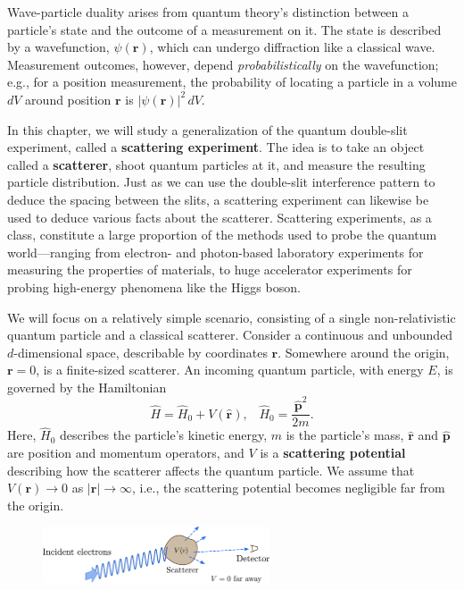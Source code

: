 \documentclass[pra,12pt]{revtex4}
\begin{document}
Wave-particle duality arises from quantum theory's distinction between
a particle's state and the outcome of a measurement on it.  The state
is described by a wavefunction, $\psi(\mathbf{r})$, which can undergo
diffraction like a classical wave.  Measurement outcomes, however,
depend \textit{probabilistically} on the wavefunction; e.g., for a
position measurement, the probability of locating a particle in a
volume $dV$ around position $\mathbf{r}$ is $|\psi(\mathbf{r})|^2
\,dV$.

In this chapter, we will study a generalization of the quantum
double-slit experiment, called a \textbf{scattering experiment}.  The
idea is to take an object called a \textbf{scatterer}, shoot quantum
particles at it, and measure the resulting particle distribution.
Just as we can use the double-slit interference pattern to deduce the
spacing between the slits, a scattering experiment can likewise be
used to deduce various facts about the scatterer.  Scattering
experiments, as a class, constitute a large proportion of the methods
used to probe the quantum world---ranging from electron- and
photon-based laboratory experiments for measuring the properties of
materials, to huge accelerator experiments for probing high-energy
phenomena like the Higgs boson.

We will focus on a relatively simple scenario, consisting of a single
non-relativistic quantum particle and a classical scatterer.  Consider
a continuous and unbounded $d$-dimensional space, describable by
coordinates $\mathbf{r}$.  Somewhere around the origin, $\mathbf{r} =
0$, is a finite-sized scatterer.  An incoming quantum particle, with
energy $E$, is governed by the Hamiltonian
\begin{equation}
  \hat{H} = \hat{H}_0 + V(\hat{\mathbf{r}}), \;\;\; \hat{H}_0 = \frac{\hat{\mathbf{p}}^2}{2m}.
\end{equation}
Here, $\hat{H}_0$ describes the particle's kinetic energy, $m$ is the
particle's mass, $\hat{\mathbf{r}}$ and $\hat{\mathbf{p}}$ are
position and momentum operators, and $V$ is a \textbf{scattering
  potential} describing how the scatterer affects the quantum
particle.  We assume that $V(\mathbf{r}) \rightarrow 0$ as
$|\mathbf{r}| \rightarrow \infty$, i.e., the scattering potential
becomes negligible far from the origin.

\begin{figure}[h]
  \centering\includegraphics[width=0.6\textwidth]{scattering}
\end{figure}
\end{document}
